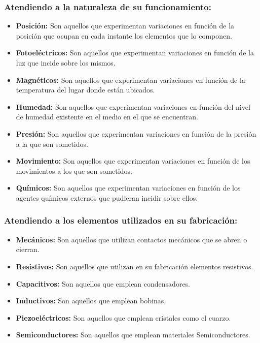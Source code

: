 \subsubsection{Atendiendo a la naturaleza de su funcionamiento:}

\begin{itemize}
 \item \textbf{Posición:} Son aquellos que experimentan variaciones en función de la posición que ocupan en cada instante los elementos que lo componen.
 \item \textbf{Fotoeléctricos:} Son aquellos que experimentan variaciones en función de la luz que incide sobre los mismos.
 \item \textbf{Magnéticos:} Son aquellos que experimentan variaciones en función de la temperatura del lugar donde están ubicados.
 \item \textbf{Humedad:} Son aquellos que experimentan variaciones en función del nivel de humedad existente en el medio en el que se encuentran.
 \item \textbf{Presión:} Son aquellos que experimentan variaciones en función de la presión a la que son sometidos.
 \item \textbf{Movimiento:} Son aquellos que experimentan variaciones en función de los movimientos a los que son sometidos.
 \item \textbf{Químicos:} Son aquellos que experimentan variaciones en función de los agentes químicos externos que pudieran incidir sobre ellos.
\end{itemize}

\subsubsection{Atendiendo a los elementos utilizados en su fabricación:}

\begin{itemize}
 \item \textbf{Mecánicos:} Son aquellos que utilizan contactos mecánicos que se abren o cierran.
 \item \textbf{Resistivos:} Son aquellos que utilizan en su fabricación elementos resistivos.
 \item \textbf{Capacitivos:} Son aquellos que emplean condensadores.
 \item \textbf{Inductivos:} Son aquellos que emplean bobinas.
 \item \textbf{Piezoeléctricos:} Son aquellos que emplean cristales como el cuarzo.
 \item \textbf{Semiconductores:} Son aquellos que emplean materiales Semiconductores.
\end{itemize}


